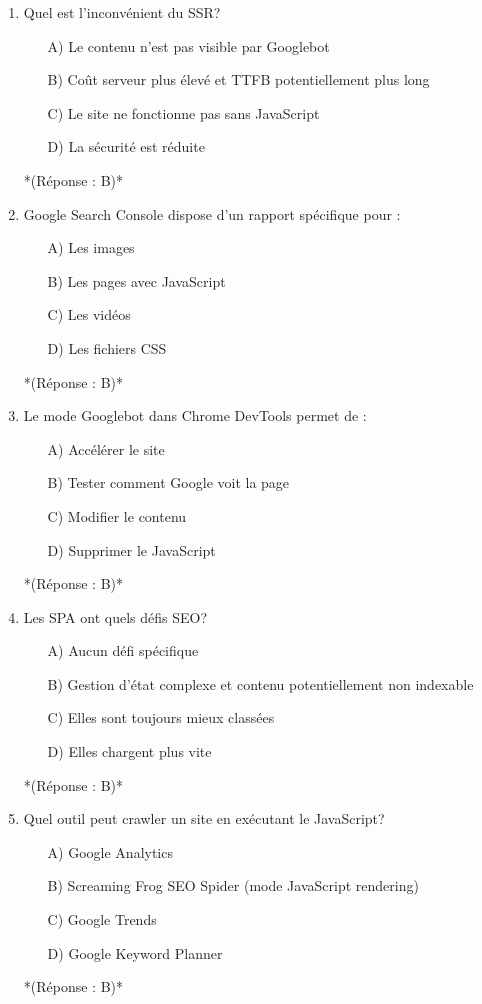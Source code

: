 \documentclass[12pt,a4paper,twoside]{report}
\begin{document}
\begin{enumerate}
\item Quel est l'inconvénient du SSR?
\begin{itemize}
\item[A)] Le contenu n'est pas visible par Googlebot
\item[B)] Coût serveur plus élevé et TTFB potentiellement plus long
\item[C)] Le site ne fonctionne pas sans JavaScript
\item[D)] La sécurité est réduite
\end{itemize}
*(Réponse : B)*

\item Google Search Console dispose d'un rapport spécifique pour :
\begin{itemize}
\item[A)] Les images
\item[B)] Les pages avec JavaScript
\item[C)] Les vidéos
\item[D)] Les fichiers CSS
\end{itemize}
*(Réponse : B)*

\item Le mode Googlebot dans Chrome DevTools permet de :
\begin{itemize}
\item[A)] Accélérer le site
\item[B)] Tester comment Google voit la page
\item[C)] Modifier le contenu
\item[D)] Supprimer le JavaScript
\end{itemize}
*(Réponse : B)*

\item Les SPA ont quels défis SEO?
\begin{itemize}
\item[A)] Aucun défi spécifique
\item[B)] Gestion d'état complexe et contenu potentiellement non indexable
\item[C)] Elles sont toujours mieux classées
\item[D)] Elles chargent plus vite
\end{itemize}
*(Réponse : B)*

\item Quel outil peut crawler un site en exécutant le JavaScript?
\begin{itemize}
\item[A)] Google Analytics
\item[B)] Screaming Frog SEO Spider (mode JavaScript rendering)
\item[C)] Google Trends
\item[D)] Google Keyword Planner
\end{itemize}
*(Réponse : B)*


\end{enumerate}
\end{document}
